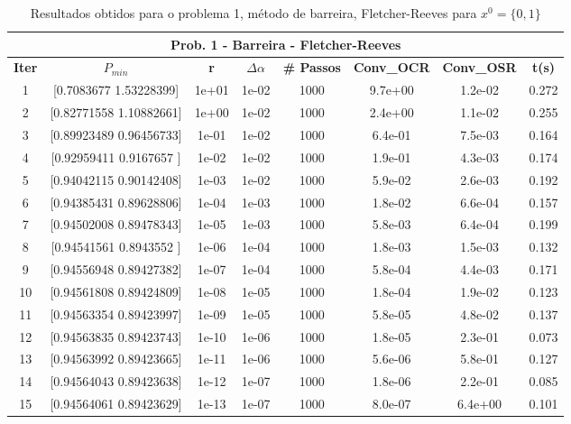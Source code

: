 \documentclass[10pt, a4paper]{article}
\begin{document}
\vspace{5mm}
\begin{table}[H]
  \begin{center}
    \begin{tabular}{c|c|c|c|c|c|c|c}
      \multicolumn{8}{c}{\textbf{Prob. 1 - Barreira - Fletcher-Reeves}}\\
      \hline
      \textbf{Iter} & \textbf{$P_{min}$} & \textbf{r} & $\Delta \alpha$ &\textbf{\# Passos} & \textbf{Conv\_OCR} & \textbf{Conv\_OSR} & \textbf{t(s)}\\
      \hline
        1& [0.7083677  1.53228399]& 1e+01& 1e-02 &1000& 9.7e+00& 1.2e-02& 0.272   \\
        2& [0.82771558 1.10882661]& 1e+00& 1e-02 &1000& 2.4e+00& 1.1e-02& 0.255\\
        3& [0.89923489 0.96456733]& 1e-01& 1e-02 &1000& 6.4e-01& 7.5e-03& 0.164\\
        4& [0.92959411 0.9167657 ]& 1e-02& 1e-02 &1000& 1.9e-01& 4.3e-03& 0.174\\
        5& [0.94042115 0.90142408]& 1e-03& 1e-02 &1000& 5.9e-02& 2.6e-03& 0.192\\
        6& [0.94385431 0.89628806]& 1e-04& 1e-03 &1000& 1.8e-02& 6.6e-04& 0.157\\
        7& [0.94502008 0.89478343]& 1e-05& 1e-03 &1000& 5.8e-03& 6.4e-04& 0.199\\
        8& [0.94541561 0.8943552 ]& 1e-06& 1e-04 &1000& 1.8e-03& 1.5e-03& 0.132\\
        9& [0.94556948 0.89427382]& 1e-07& 1e-04 &1000& 5.8e-04& 4.4e-03& 0.171\\
        10& [0.94561808 0.89424809]& 1e-08& 1e-05 &1000& 1.8e-04& 1.9e-02& 0.123\\
        11& [0.94563354 0.89423997]& 1e-09& 1e-05 &1000& 5.8e-05& 4.8e-02& 0.137\\
        12& [0.94563835 0.89423743]& 1e-10& 1e-06 &1000& 1.8e-05& 2.3e-01& 0.073\\
        13& [0.94563992 0.89423665]& 1e-11& 1e-06 &1000& 5.6e-06& 5.8e-01& 0.127\\
        14& [0.94564043 0.89423638]& 1e-12& 1e-07 &1000& 1.8e-06& 2.2e-01& 0.085\\
        15& [0.94564061 0.89423629]& 1e-13& 1e-07 &1000& 8.0e-07& 6.4e+00& 0.101\\
    \end{tabular}
  \end{center}
  \caption{Resultados obtidos para o problema 1, método de barreira, Fletcher-Reeves para $x^0=\{0,1\}$}
\end{table}
\end{document}
